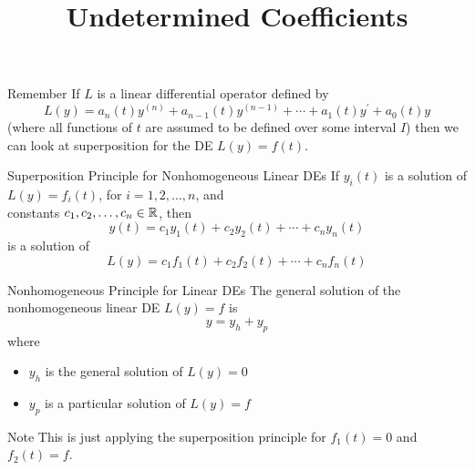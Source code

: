 \documentclass{beamer}
\title[MA245 - Section 4.4]{Undetermined Coefficients}
\begin{document}
\begin{frame}
  \titlepage
\end{frame}

\begin{frame}
\begin{block}{Remember}
If $L$ is a linear differential operator defined by
\begin{equation*}
L(y)=a_n(t)y^{(n)}+a_{n-1}(t)y^{(n-1)}+\cdots+a_1(t)y^\prime+a_0(t)y
\end{equation*}
(where all functions of $t$ are assumed to be defined over some interval $I$) then we can look at superposition for the DE $L(y)=f(t)$.
\end{block}\pause

\begin{block}{Superposition Principle for Nonhomogeneous Linear DEs}
If $y_i(t)$ is a solution of $L(y)=f_i(t)$, for $i=1,2,\ldots,n$, and\\ constants $c_1,c_2,\ldots,c_n\in\mathbb{R}$, then
\begin{equation*}
y(t)=c_1 y_1(t) + c_2 y_2(t) + \cdots + c_n y_n(t)
\end{equation*}
is a solution of
\begin{equation*}
L(y)=c_1 f_1(t) + c_2 f_2(t) + \cdots + c_n f_n(t)
\end{equation*}
\end{block}
\end{frame}

\begin{frame}
\begin{block}{Nonhomogeneous Principle for Linear DEs}
The general solution of the nonhomogeneous linear DE $L(y)=f$ is
\begin{equation*}
y=y_h+y_p
\end{equation*}
where
\begin{itemize}
\item $y_h$ is the general solution of $L(y)=0$
\item $y_p$ is a particular solution of $L(y)=f$
\end{itemize}
\end{block}\pause

\begin{block}{Note}
This is just applying the superposition principle for $f_1(t)=0$ and $f_2(t)=f$.
\end{block}
\end{frame}
\end{document}
